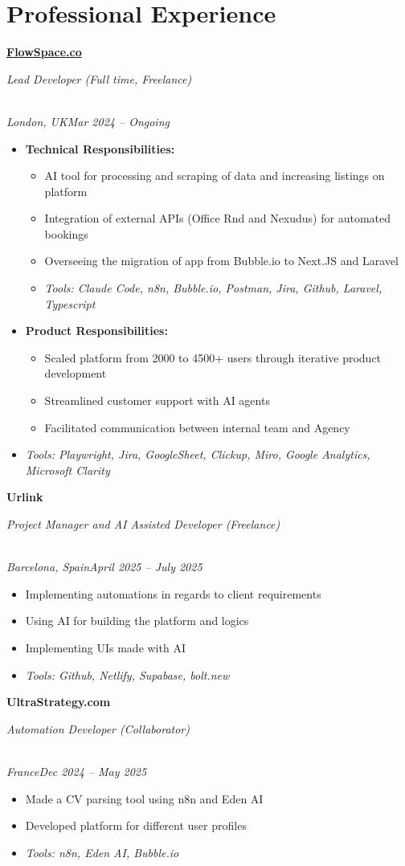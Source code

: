 \documentclass[a4paper,10pt]{article}
\newcommand{\role}[4]{\vspace{3pt}\noindent\hspace{0.6em}\parbox[t]{0.38\textwidth}{\raggedright\textbf{#1}}\hfill\parbox[t]{0.58\textwidth}{\raggedleft\textit{#2}}\\{\textit{#3}\hfill\textit{#4}}\vspace{1pt}}
\begin{document}
\section{Professional Experience}
\role{\href{https://flowspace.co}{FlowSpace.co}}{Lead Developer (Full time, Freelance)}{London, UK}{Mar 2024 -- Ongoing}
\begin{itemize}
\item \textbf{Technical Responsibilities:}
\begin{itemize}[label=--]
\item AI tool for processing and scraping of data and increasing listings on platform
\item Integration of external APIs (Office Rnd and Nexudus) for automated bookings
\item Overseeing the migration of app from Bubble.io to Next.JS and Laravel
\item \textit{Tools: Claude Code, n8n, Bubble.io, Postman, Jira, Github, Laravel, Typescript}
\end{itemize}
\item \textbf{Product Responsibilities:}
\begin{itemize}[label=--]
\item Scaled platform from 2000 to 4500+ users through iterative product development
\item Streamlined customer support with AI agents
\item Facilitated communication between internal team and Agency
\end{itemize}
\item \textit{Tools: Playwright, Jira, GoogleSheet, Clickup, Miro, Google Analytics, Microsoft Clarity}
\end{itemize}

\role{Urlink}{Project Manager and AI Assisted Developer (Freelance)}{Barcelona, Spain}{April 2025 -- July 2025}
\begin{itemize}
\item Implementing automations in regards to client requirements
\item Using AI for building the platform and logics
\item Implementing UIs made with AI
\item \textit{Tools: Github, Netlify, Supabase, bolt.new}
\end{itemize}

\role{UltraStrategy.com}{Automation Developer (Collaborator)}{France}{Dec 2024 -- May 2025}
\begin{itemize}
\item Made a CV parsing tool using n8n and Eden AI
\item Developed platform for different user profiles
\item \textit{Tools: n8n, Eden AI, Bubble.io}
\end{itemize}
\end{document}
